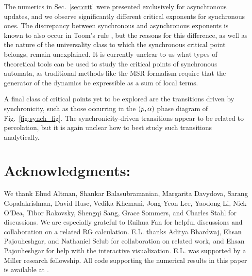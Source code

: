 \documentclass[pra,aps,twocolumn,groupedaddress,superscriptaddress,nofootinbib,preprintnumbers]{revtex4-2}
\begin{document}
	The numerics in Sec.~\ref{sec:crit} were presented exclusively for asynchronous updates, and we observe significantly different critical exponents for synchronous ones. The discrepancy between synchronous and asynchronous exponents is known to also occur in Toom's rule \cite{makowiec2000study,takeuchi2006can,ray2024protecting}, but the reasons for this difference, as well as the nature of the universality class to which the synchronous critical point belongs, remain unexplained. It is currently unclear to us what types of theoretical tools can be used to study the critical points of synchronous automata, as traditional methods like the MSR formalism require that the generator of the dynamics be expressible as a sum of local terms. 
	
	A final class of critical points yet to be explored are the transitions driven by synchronicity, such as those occurring in the $(p,\alpha)$ phase diagram of Fig.~\ref{fig:synch_fig}. The synchronicity-driven transitions appear to be related to percolation, but it is again unclear how to best study such transitions analytically.


    \ms 
	
	\section{Acknowledgments: } 
	
	We thank Ehud Altman, Shankar Balasubramanian, Margarita Davydova, Sarang Gopalakrishnan, David Huse, Vedika Khemani, Jong-Yeon Lee, Yaodong Li, Nick O'Dea, Tibor Rakovsky, Shengqi Sang, Grace Sommers, and Charles Stahl for discussions. We are especially grateful to Ruihua Fan for helpful discussions and collaboration on a related RG calculation. E.L. thanks Aditya Bhardwaj, Ehsan Pajouheshgar, and Nathaniel Selub for collaboration on related work, and Ehsan Pajouheshgar for help with the interactive visualization. E.L. was supported by a Miller research fellowship. All code supporting the numerical results in this paper is available at \cite{code}. 
	
	\appendix
	\makeatletter
	\let\@orig@addcontentsline\addcontentsline
	\renewcommand{\addcontentsline}[3]{%
		\edef\@app@file{#1}\edef\@app@toc{toc}%
		\edef\@app@type{#2}\edef\@app@keep{section}%
		\ifx\@app@file\@app@toc
			\ifx\@app@type\@app@keep
				\@orig@addcontentsline{#1}{#2}{#3}%
			\fi
		\else
			\@orig@addcontentsline{#1}{#2}{#3}%
		\fi}
	\makeatother
\end{document}
